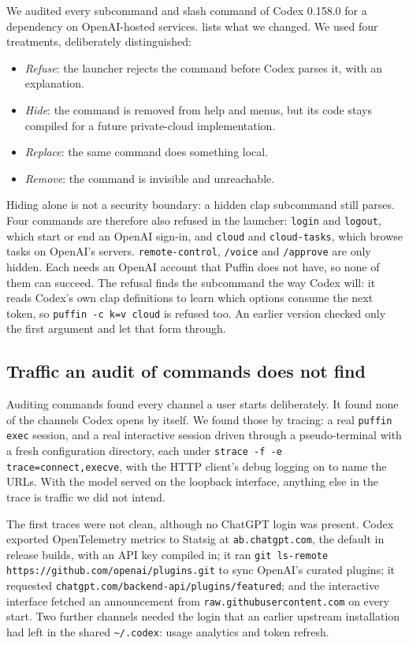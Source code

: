 \documentclass[11pt]{article}
\newcommand{\code}[1]{\texttt{#1}}
\begin{document}
We audited every subcommand and slash command of Codex 0.158.0 for a dependency on OpenAI-hosted
services.  lists what we changed. We used four treatments, deliberately
distinguished:
\begin{itemize}
  \item \emph{Refuse}: the launcher rejects the command before Codex parses it, with an explanation.
  \item \emph{Hide}: the command is removed from help and menus, but its code stays compiled for a
    future private-cloud implementation.
  \item \emph{Replace}: the same command does something local.
  \item \emph{Remove}: the command is invisible and unreachable.
\end{itemize}
Hiding alone is not a security boundary: a hidden clap subcommand still parses. Four commands are
therefore also refused in the launcher: \code{login} and \code{logout}, which start or end an
OpenAI sign-in, and \code{cloud} and \code{cloud-tasks}, which browse tasks on OpenAI's servers.
\code{remote-control}, \code{/voice} and \code{/approve} are only hidden. Each needs an OpenAI
account that Puffin does not have, so none of them can succeed.
The refusal finds the subcommand the way Codex will: it reads Codex's own clap definitions to learn
which options consume the next token, so \code{puffin -c k=v cloud} is refused too. An earlier
version checked only the first argument and let that form through.

\subsection{Traffic an audit of commands does not find}
\label{sec:egress}

Auditing commands found every channel a user starts deliberately. It found none of the channels
Codex opens by itself. We found those by tracing: a real \code{puffin exec} session, and a real
interactive session driven through a pseudo-terminal with a fresh configuration directory, each
under \code{strace -f -e trace=connect,execve}, with the HTTP client's debug logging on to name the
URLs. With the model served on the loopback interface, anything else in the trace is traffic we
did not intend.

The first traces were not clean, although no ChatGPT login was present. Codex exported OpenTelemetry
metrics to Statsig at \code{ab.chatgpt.com}, the default in release builds, with an API key compiled
in; it ran \code{git ls-remote https://github.com/openai/plugins.git} to sync OpenAI's curated
plugins; it requested \code{chatgpt.com/backend-api/plugins/featured}; and the interactive
interface fetched an announcement from \code{raw.githubusercontent.com} on every start. Two further
channels needed the login that an earlier upstream installation had left in the shared
\code{\textasciitilde/.codex}: usage analytics and token refresh.
\end{document}
